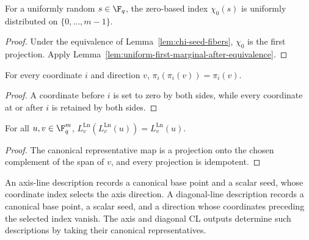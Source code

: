 \begin{lemma}\label{lem:chi-index-uniform}
	\leanok
	For a uniformly random $s\in\F_q$, the zero-based index $\chi_0(s)$ is
	uniformly distributed on $\{0,\ldots,m-1\}$.
\end{lemma}
\begin{proof}
	\leanok
	Under the equivalence of Lemma~\ref{lem:chi-seed-fibers}, $\chi_0$ is the first
	projection. Apply Lemma~\ref{lem:uniform-first-marginal-after-equivalence}.
\end{proof}

\begin{lemma}
	\label{lem:prefix-projection-idempotent}
	\leanok
	For every coordinate $i$ and direction $v$,
	$\pi_i(\pi_i(v))=\pi_i(v)$.
\end{lemma}
\begin{proof}
	\leanok
	A coordinate before $i$ is set to zero by both sides, while every coordinate
	at or after $i$ is retained by both sides.
\end{proof}

\begin{lemma}
	\label{lem:line-representative-idempotent}
	\leanok
	For all $u,v\in\F_q^m$,
	$L^{\mathrm{Ln}}_v(L^{\mathrm{Ln}}_v(u))=L^{\mathrm{Ln}}_v(u)$.
\end{lemma}
\begin{proof}
	\leanok
	The canonical representative map is a projection onto the chosen complement
	of the span of $v$, and every projection is idempotent.
\end{proof}

\begin{definition}\label{def:ld-line-description}
	\leanok
	An axis-line description records a canonical base point and a scalar seed,
	whose coordinate index selects the axis direction. A diagonal-line
	description records a canonical base point, a scalar seed, and a direction
	whose coordinates preceding the selected index vanish. The axis and diagonal
	CL outputs determine such descriptions by taking their canonical
	representatives.
\end{definition}

